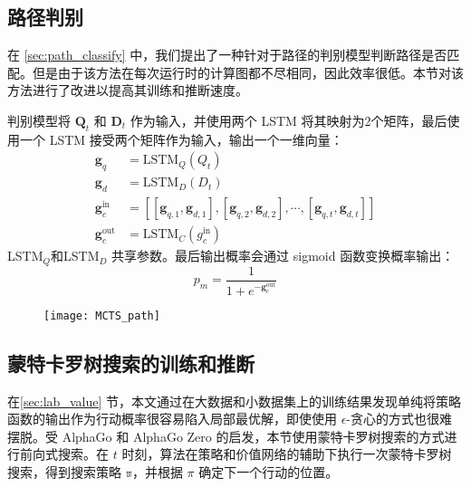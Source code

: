 \subsection{路径判别}
在 \ref{sec:path_classify} 中，我们提出了一种针对于路径的判别模型判断路径是否匹配。但是由于该方法在每次运行时的计算图都不尽相同，因此效率很低。本节对该方法进行了改进以提高其训练和推断速度。

判别模型将 $\mathbf{Q}_t$ 和 $\mathbf{D}_t$ 作为输入，并使用两个 LSTM 将其映射为2个矩阵，最后使用一个 LSTM 接受两个矩阵作为输入，输出一个一维向量：
$$
\begin{aligned}
\mathbf{g}_q &= \mathrm{LSTM}_Q(Q_t)\\
\mathbf{g}_d &= \mathrm{LSTM}_D(D_t)\\
\mathbf{g}_c^{\text{in}} &= [[\mathbf{g}_{q, 1}, \mathbf{g}_{d, 1}], [\mathbf{g}_{q, 2}, \mathbf{g}_{d, 2}], \cdots, [\mathbf{g}_{q, t}, \mathbf{g}_{d, t}]]\\
\mathbf{g}_c^{\text{out}} &= \mathrm{LSTM}_C({g}_c^{\text{in}})
\end{aligned}
$$
LSTM$_Q$和LSTM$_D$ 共享参数。最后输出概率会通过 sigmoid 函数变换概率输出：
\begin{equation}
\label{eq:classification_model}
p_m = \frac{1}{1+e^{-{\mathbf{g}_c^{\text{out}}}}}
\end{equation}

\begin{figure}[!htbp]
    \centering
    \texttt{[image: MCTS\_path]}
    \label{fig:MCTS_path}
\end{figure}

\subsection{蒙特卡罗树搜索的训练和推断}
\label{sec:MCTS_train}
在\ref{sec:lab_value} 节，本文通过在大数据和小数据集上的训练结果发现单纯将策略函数的输出作为行动概率很容易陷入局部最优解，即使使用 $\epsilon$-贪心的方式也很难摆脱。受 AlphaGo 和 AlphaGo Zero 的启发，本节使用蒙特卡罗树搜索的方式进行前向式搜索。在 $t$ 时刻，算法在策略和价值网络的辅助下执行一次蒙特卡罗树搜索，得到搜索策略 $\mathbb{\pi}$，并根据 $\pi$ 确定下一个行动的位置。

